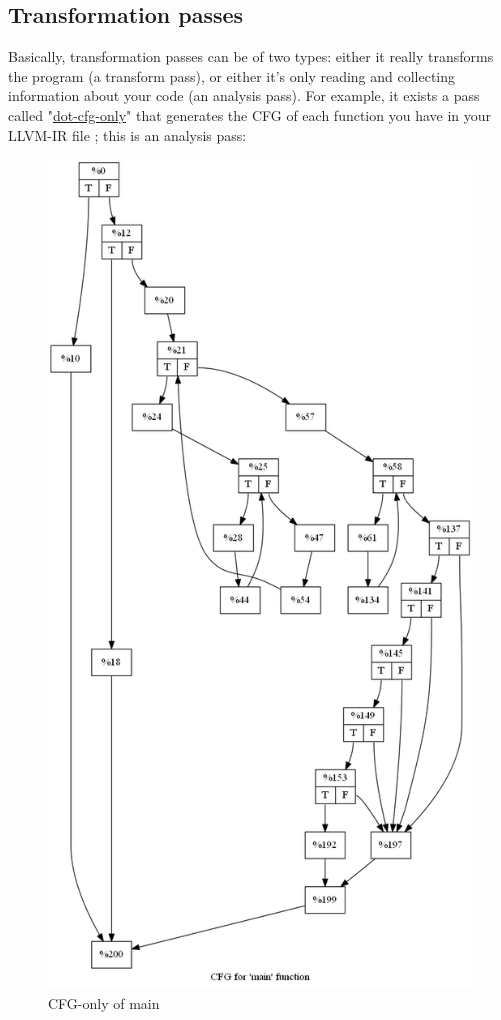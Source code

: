 \documentclass[a4paper, 11pt, notitlepage]{report}
\begin{document}
\subsection{Transformation passes}
Basically, transformation passes can be of two types: either it really transforms the program (a transform pass), or either it's only reading and collecting information about your code (an analysis pass). For example, it exists a pass called "\href{https://llvm.org/viewvc/llvm-project/llvm/trunk/lib/Analysis/CFGPrinter.cpp?view=markup}{dot-cfg-only}" that generates the CFG of each function you have in your LLVM-IR file ; this is an analysis pass:
\begin{figure}[H]
  \centering
  \includegraphics[scale=0.2]{pics/cfg.png}
  \caption{CFG-only of main}
\end{figure}
\end{document}
